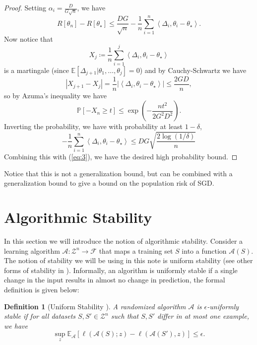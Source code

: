 \documentclass{article}[12pt]
\newtheorem{defn}{Definition}
\def\A{\mathcal{A}}
\def\E{\mathbb{E}}
\def\F{\mathcal{F}}
\def\P{\mathbb{P}}
\def\Z{\mathcal{Z}}
\newcommand{\abs}[1]{\left\vert#1\right\vert}
\newcommand{\innprod}[2]{\left\langle#1, #2\right\rangle}
\def \E{\mathbb{E}}
\def \P{\mathbb{P}}
\begin{document}
\begin{proof}
Setting $\alpha_i = \frac{D}{G\sqrt{n}}$, we have 
\begin{equation}
   \label{eq:3}
R[\theta_n] - R[\theta_\star] \leq \frac{DG}{\sqrt{n}} - \frac{1}{n} \sum_{i = 1}^{n} \innprod{\Delta_i}{\theta_i - \theta_\star}.
\end{equation}
Now notice that 
\[
   X_j \coloneqq \frac{1}{n} \sum_{i=1}^j \innprod{\Delta_i}{\theta_i - \theta_\star}
\] is a martingale (since $\E[\Delta_{j+1} | \theta_1, \ldots, \theta_j] = 0$) and by Cauchy-Schwartz we have 
\[
\abs{X_{j+1} - X_j} = \frac{1}{n} \abs{\innprod{\Delta_i}{\theta_i - \theta_\star}} \leq \frac{2GD}{n}  , 
\]  so by Azuma's inequality we have 
\[
\P [- X_n \geq t] \leq \exp\left( -\frac{nt^2}{2 G^2 D^2} \right) . 
\]
Inverting the probability, we have with probability at least $1 - \delta$, 
\[
- \frac{1}{n} \sum_{i=1}^n \innprod{\Delta_i}{\theta_i - \theta_\star}\leq DG \sqrt{\frac{2\log(1/\delta)}{n}}
\] 
Combining this with (\ref{eq:3}), we have the desired high probability bound.
\end{proof}
Notice that this is not a generalization bound, but can be combined with a generalization bound to give a bound on the population risk of SGD.


\section{Algorithmic Stability} \label{stability}
In this section we will introduce the notion of algorithmic stability. Consider a learning algorithm $\A : \Z^n \to \F$ that maps a training set $S$ into a function $\A(S)$. 
The notion of stability we will be using in this note is uniform stability (see other forms of stability in \cite{Bousquet}). 
Informally, an algorithm is uniformly stable if a single change in the input results in almost no change in prediction, the formal definition is given below:
\begin{defn}[Uniform Stability \cite{Bousquet}]
   A randomized algorithm $\A$ is $\epsilon$-uniformly stable if for all datasets $S, S' \in \Z^n$ such that $S, S'$ differ in at most one example, we have 
   \[
   \sup_z \E_\A[\ell(\A(S); z) - \ell(\A(S'), z)]  \leq \epsilon.
   \]
\end{defn}
\end{document}

